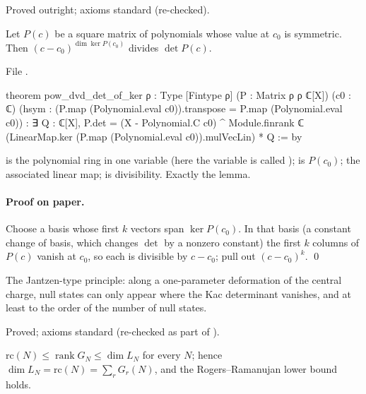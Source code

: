 \begin{status}
Proved outright; axioms standard (re-checked).
\end{status}

\begin{lemma}\label{l28:lem:corank}
Let $P(c)$ be a square matrix of polynomials whose value at $c_0$ is symmetric. Then $(c-c_0)^{\dim\ker P(c_0)}$ divides $\det P(c)$.
\end{lemma}

\noindent File .
\begin{leancode}
theorem pow_dvd_det_of_ker {ρ : Type} [Fintype ρ] (P : Matrix ρ ρ ℂ[X]) (c0 : ℂ)
    (hsym : (P.map (Polynomial.eval c0)).transpose = P.map (Polynomial.eval c0)) :
    ∃ Q : ℂ[X], P.det =
      (X - Polynomial.C c0) ^ Module.finrank ℂ (LinearMap.ker (P.map (Polynomial.eval c0)).mulVecLin) * Q := by
\end{leancode}

\begin{dictionary}
 is the polynomial ring in one variable (here the variable is called );  is $P(c_0)$;  the
associated linear map;  is divisibility. Exactly the lemma.
\end{dictionary}

\paragraph{Proof on paper.} Choose a basis whose first $k$ vectors span $\ker P(c_0)$. In that basis (a constant change of basis, which changes $\det$ by a nonzero
constant) the first $k$ columns of $P(c)$ vanish at $c_0$, so each is divisible by $c-c_0$; pull out $(c-c_0)^k$. \qed

\begin{physics}
The Jantzen-type principle: along a one-parameter deformation of the central charge, null states can only appear where the Kac determinant vanishes, and at
least to the order of the number of null states.
\end{physics}

\begin{status}
Proved; axioms standard (re-checked as part of ).
\end{status}

\begin{theorem}\label{l28:thm:lychar}
$\mathrm{rc}(N)\le\operatorname{rank}G_N\le\dim L_N$ for every $N$; hence $\dim L_N=\mathrm{rc}(N)=\sum_rG_r(N)$, and the Rogers--Ramanujan lower bound holds.
\end{theorem}

